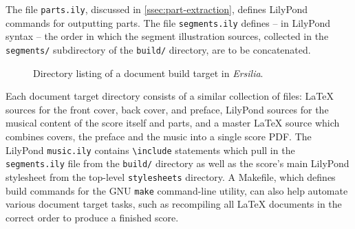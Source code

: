 The file \texttt{parts.ily}, discussed in \autoref{ssec:part-extraction},
defines LilyPond commands for outputting parts. The file \texttt{segments.ily}
defines -- in LilyPond syntax -- the order in which the segment illustration
sources, collected in the \texttt{segments/} subdirectory of the
\texttt{build/} directory, are to be concatenated.

\begin{figure}[h!]
\begin{singlespacing}
\vspace{-0.5\baselineskip}
\end{singlespacing}
\caption{Directory listing of a document build target in \emph{Ersilia}.}
\end{figure}

Each document target directory consists of a similar collection of files: LaTeX
sources for the front cover, back cover, and preface, LilyPond sources for the
musical content of the score itself and parts, and a master LaTeX source which
combines covers, the preface and the music into a single score PDF. The
LilyPond \texttt{music.ily} contains \texttt{\textbackslash{}include}
statements which pull in the \texttt{segments.ily} file from the
\texttt{build/} directory as well as the score's main LilyPond stylesheet from
the top-level \texttt{stylesheets} directory. A Makefile, which defines build
commands for the GNU \texttt{make} command-line utility, can also help automate
various document target tasks, such as recompiling all LaTeX documents in the
correct order to produce a finished score.

